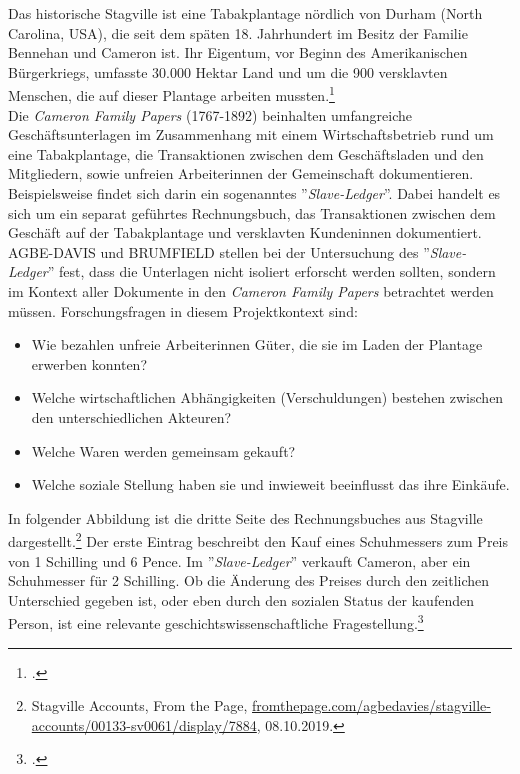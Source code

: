 \documentclass[12pt,a4paper]{article}
\begin{document}
Das historische Stagville ist eine Tabakplantage nördlich von Durham (North Carolina, USA), die seit dem späten 18. Jahrhundert im Besitz der Familie Bennehan und Cameron ist. Ihr Eigentum, vor Beginn des Amerikanischen Bürgerkriegs, umfasste 30.000 Hektar Land und um die 900 versklavten Menschen, die auf dieser Plantage arbeiten mussten.\footcite[][]{brumfield2015medea}
\\
Die \textit{Cameron Family Papers} (1767-1892) beinhalten umfangreiche Geschäftsunterlagen im Zusammenhang mit einem Wirtschaftsbetrieb rund um eine Tabakplantage, die Transaktionen zwischen dem Geschäftsladen und den Mitgliedern, sowie unfreien Arbeiterinnen der Gemeinschaft dokumentieren. Beispielsweise findet sich darin ein sogenanntes ''\textit{Slave-Ledger}''. Dabei handelt es sich um ein separat geführtes Rechnungsbuch, das Transaktionen zwischen dem Geschäft auf der Tabakplantage und versklavten Kundeninnen dokumentiert.
\\
AGBE-DAVIS und BRUMFIELD stellen bei der Untersuchung des ''\textit{Slave-Ledger}'' fest, dass die Unterlagen nicht isoliert erforscht werden sollten, sondern im Kontext aller Dokumente in den \textit{Cameron Family Papers} betrachtet werden müssen. Forschungsfragen in diesem Projektkontext sind:
\begin{itemize}
\item Wie bezahlen unfreie Arbeiterinnen Güter, die sie im Laden der Plantage erwerben konnten?
\item Welche wirtschaftlichen Abhängigkeiten (Verschuldungen) bestehen zwischen den unterschiedlichen Akteuren?
\item Welche Waren werden gemeinsam gekauft?
\item Welche soziale Stellung haben sie und inwieweit beeinflusst das ihre Einkäufe.
\end{itemize}
In folgender Abbildung ist die dritte Seite des Rechnungsbuches aus Stagville dargestellt.\footnote{Stagville Accounts, From the Page, \protect\url{fromthepage.com/agbedavies/stagville-accounts/00133-sv0061/display/7884}, 08.10.2019.} Der erste Eintrag beschreibt den Kauf eines Schuhmessers zum Preis von 1 Schilling und 6 Pence. Im ''\textit{Slave-Ledger}'' verkauft Cameron, aber ein Schuhmesser für 2 Schilling. Ob die Änderung des Preises durch den zeitlichen Unterschied gegeben ist, oder eben durch den sozialen Status der kaufenden Person, ist eine relevante geschichtswissenschaftliche Fragestellung.\footcite[][]{brumfield2019blog}
\end{document}
